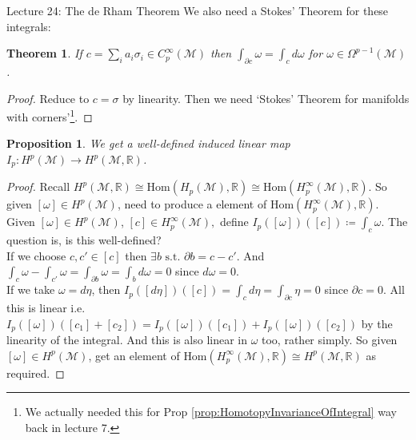 \documentclass[10pt]{article}
\theoremstyle{plain}
\newtheorem{theorem}{Theorem}[section]
\newtheorem{prop}[thm]{Proposition}
\theoremstyle{definition}
\newcommand{\st}{\text{ s.t. }}
\newcommand{\Real}{\mathbb{R}}
\newcommand{\man}{\mathcal{M}}
\newcommand{\Hom}[2]{\text{Hom}\left(#1,#2\right)}
\newcommand{\pformman}[1]{\Omega^{#1}(\man)}
\newcommand{\deriv}{d}
\newcommand{\dw}{d\omega}
\newcommand{\deta}{\deriv\eta}
\begin{document}
\begin{section}{Lecture 24: The de Rham Theorem}
We also need a Stokes' Theorem for these integrals:
\begin{theorem}
    If $c = \sum_i a_i \sigma_i \in C_p^\infty(\man) $ then $\int_{\partial c} \omega = \int_c \dw$ for $\omega \in \pformman{p-1}$.
\end{theorem}
\begin{proof}
    Reduce to $c = \sigma$ by linearity. Then we need `Stokes' Theorem for manifolds with corners'\footnote{We actually needed this for Prop \ref{prop:HomotopyInvarianceOfIntegral} way back in lecture 7.}.
\end{proof}

\begin{prop}
    We get a well-defined induced linear map $I_p : H^p(\man) \to H^p(\man,\Real)$.
\end{prop}
\begin{proof}
    Recall $H^p(\man,\Real) \cong \Hom{H_p(\man)}{\Real} \cong \Hom{H_p^\infty(\man)}{\Real}$. So given $[\omega] \in H^p(\man)$, need to produce a element of $\Hom{H_p^\infty(\man)}{\Real}$. Given $[\omega] \in H^p(\man)$, $[c] \in H_p^\infty(\man),$ define $I_p([\omega])([c]) \coloneqq \int_c \omega$. The question is, is this well-defined?\\
    If we choose $c, c'\in [c]$ then $\exists b \st \partial b = c - c'$. And $\int_c \omega - \int_{c'} \omega = \int_{\partial b} \omega = \int_b \dw = 0$ since $\dw = 0$.\\
    If we take $\omega = \deta$, then $I_p([\deta])([c]) = \int_c \deta = \int_{\partial c} \eta = 0$ since $\partial c = 0$. All this is linear i.e. $I_p([\omega])([c_1]+[c_2]) = I_p([\omega])([c_1])+I_p([\omega])([c_2])$ by the linearity of the integral. And this is also linear in $\omega$ too, rather simply. So given $[\omega] \in H^p(\man)$, get an element of $\Hom{H_p^\infty(\man)}{\Real} \cong H^p(\man,\Real)$ as required.
\end{proof}



\end{section}
\end{document}
